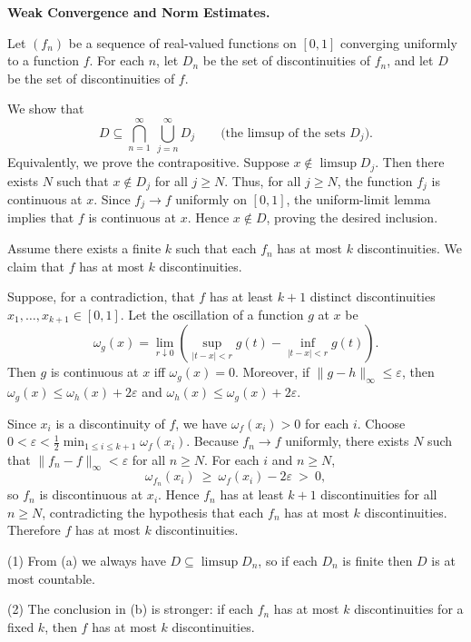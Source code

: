 \begin{problem}[CP-II-0440]
\label{prob:cp-ii-0440}
\textbf{Weak Convergence and Norm Estimates.}

\hspace*{1.5em}Let $(f_n)$ be a sequence of real-valued functions on $[0,1]$ converging uniformly to a function $f$.
For each $n$, let $D_n$ be the set of discontinuities of $f_n$, and let $D$ be the set of discontinuities of $f$.

We show that
\[
D \subseteq \bigcap_{n=1}^{\infty}\ \bigcup_{j=n}^{\infty} D_j
\qquad\text{(the limsup of the sets $D_j$).}
\]
Equivalently, we prove the contrapositive. Suppose $x\notin \limsup D_j$. Then there exists $N$ such that
$x\notin D_j$ for all $j\ge N$. Thus, for all $j\ge N$, the function $f_j$ is continuous at $x$.
Since $f_j \to f$ uniformly on $[0,1]$, the uniform-limit lemma implies that $f$ is continuous at $x$.
Hence $x\notin D$, proving the desired inclusion.

Assume there exists a finite $k$ such that each $f_n$ has at most $k$ discontinuities.
We claim that $f$ has at most $k$ discontinuities.

Suppose, for a contradiction, that $f$ has at least $k+1$ distinct discontinuities $x_1,\dots,x_{k+1}\in[0,1]$.
Let the oscillation of a function $g$ at $x$ be
\[
\omega_g(x)=\lim_{r\downarrow 0}\left(\sup_{|t-x|<r} g(t) - \inf_{|t-x|<r} g(t)\right).
\]
Then $g$ is continuous at $x$ iff $\omega_g(x)=0$. Moreover, if $\|g-h\|_\infty\le \varepsilon$, then
$\omega_g(x)\le\omega_h(x)+2\varepsilon$ and $\omega_h(x)\le\omega_g(x)+2\varepsilon$.

Since $x_i$ is a discontinuity of $f$, we have $\omega_f(x_i)>0$ for each $i$.
Choose $0<\varepsilon<\frac12\min_{1\le i\le k+1}\omega_f(x_i)$.
Because $f_n\to f$ uniformly, there exists $N$ such that $\|f_n-f\|_\infty<\varepsilon$ for all $n\ge N$.
For each $i$ and $n\ge N$,
\[
\omega_{f_n}(x_i)\ \ge\ \omega_f(x_i) - 2\varepsilon\ >\ 0,
\]
so $f_n$ is discontinuous at $x_i$. Hence $f_n$ has at least $k+1$ discontinuities for all $n\ge N$,
contradicting the hypothesis that each $f_n$ has at most $k$ discontinuities.
Therefore $f$ has at most $k$ discontinuities.

(1) From (a) we always have $D \subseteq \limsup D_n$, so if each $D_n$ is finite then $D$ is at most countable.

(2) The conclusion in (b) is stronger: if each $f_n$ has at most $k$ discontinuities for a fixed $k$, then $f$ has at most $k$ discontinuities.


\end{problem}
